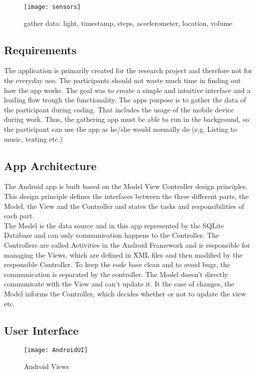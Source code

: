 \begin{figure}
\centering
\texttt{[image: sensors]}
\caption{gather data: light, timestamp, steps, accelerometer, location, volume}\label{sensors}
\vspace{5 mm}
\end{figure}

\subsection{Requirements}
The application is primarily created for the research project and therefore not for the everyday use. The participants should not waste much time in finding out how the app works. The goal was to create a simple and intuitive interface and a leading flow trough the functionality. The apps purpose is to gather the data of the participant during coding. That includes the usage of the mobile device during work. Thus, the gathering app must be able to run in the background, so the participant can use the app as he/she would normally do (e.g. Listing to music, texting etc.)

\subsection{App Architecture}
The Android app is built based on the Model View Controller design principles. This design principle defines the interfaces between the three different parts, the Model, the View and the Controller and states the tasks and responsibilities of each part.\\
The Model is the data source and in this app represented by the SQLite Database and can only communication happens to the Controller. 
The Controllers are called Activities in the Android Framework and is responsible for managing the Views, which are defined in XML files and then modified by the responsible Controller. 
To keep the code base clean and to avoid bugs, the communication is separated by the controller. The Model doesn't directly communicate with the View and can't update it. It the case of changes, the Model informs the Controller, which decides whether or not to update the view etc. 

\subsection{User Interface}

\begin{figure}
\texttt{[image: AndroidUI]}
\caption{Android Views}\label{aviews}
\vspace{10 mm}
\end{figure}

